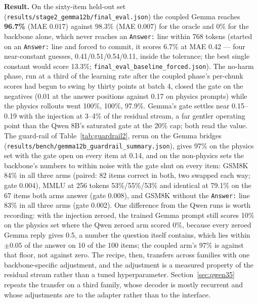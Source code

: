 \documentclass[11pt]{article}
\newcommand{\code}[1]{\texttt{#1}}
\begin{document}
\textbf{Result.} On the sixty-item held-out set (\code{results/stage2\_gemma12b/final\_eval.json}) the coupled Gemma reaches \textbf{96.7\%} (MAE 0.017) against 98.3\% (MAE 0.007) for the oracle and 0\% for the backbone alone, which never reaches an \code{Answer:} line within 768 tokens (started on an \code{Answer:} line and forced to commit, it scores 6.7\% at MAE 0.42 --- four near-constant guesses, 0.41/0.51/0.54/0.11, inside the tolerance; the best single constant would score 13.3\%; \code{final\_eval\_baseline\_forced.json}). The no-harm phase, run at a third of the learning rate after the coupled phase's per-chunk scores had begun to swing by thirty points at batch 4, closed the gate on the negatives (0.01 at the answer positions against 0.17 on physics prompts) while the physics rollouts went 100\%, 100\%, 97.9\%. Gemma's gate settles near 0.15--0.19 with the injection at 3--4\% of the residual stream, a far gentler operating point than the Qwen 8B's saturated gate at the 20\% cap; both read the value. The guard-rail of Table~\ref{tab:guardrail2}, rerun on the Gemma bridges (\code{results/bench/gemma12b\_guardrail\_summary.json}), gives 97\% on the physics set with the gate open on every item at 0.14, and on the non-physics sets the backbone's numbers to within noise with the gate shut on every item: GSM8K 84\% in all three arms (paired: 82 items correct in both, two swapped each way; gate 0.004), MMLU at 256 tokens 53\%/55\%/53\% and identical at 79.1\% on the 67 items both arms answer (gate 0.008), and GSM8K without the \code{Answer:} line 83\% in all three arms (gate 0.002). One difference from the Qwen runs is worth recording: with the injection zeroed, the trained Gemma prompt still scores 10\% on the physics set where the Qwen zeroed arm scored 0\%, because every zeroed Gemma reply gives 0.5, a number the question itself contains, which lies within $\pm 0.05$ of the answer on 10 of the 100 items; the coupled arm's 97\% is against that floor, not against zero. The recipe, then, transfers across families with one backbone-specific adjustment, and the adjustment is a measured property of the residual stream rather than a tuned hyperparameter. Section~\ref{sec:qwen35} repeats the transfer on a third family, whose decoder is mostly recurrent and whose adjustments are to the adapter rather than to the interface.
\end{document}
